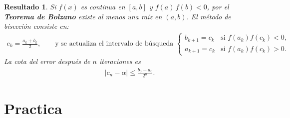 \documentclass[12pt]{article}
\newtheorem{Result}{Resultado}
\begin{document}
\begin{Result}
Si $f(x)$ es continua en $[a,b]$ y $f(a)\,f(b)<0$, por el \textbf{Teorema de Bolzano} existe al menos una raíz en $(a,b)$.  
El método de bisección consiste en:
\begin{eqnarray}
c_k = \frac{a_k + b_k}{2}, \qquad
\text{y se actualiza el intervalo de b\'usqueda } 
\begin{cases}
b_{k+1} = c_k & \text{si } f(a_k)f(c_k) < 0,\\
a_{k+1} = c_k & \text{si } f(a_k)f(c_k) > 0.
\end{cases}
\end{eqnarray}
La cota del error después de $n$ iteraciones es
\begin{eqnarray}
|c_n - \alpha| \le \frac{b_0 - a_0}{2^n}.
\end{eqnarray}
\end{Result}

\section{Practica}
\end{document}
